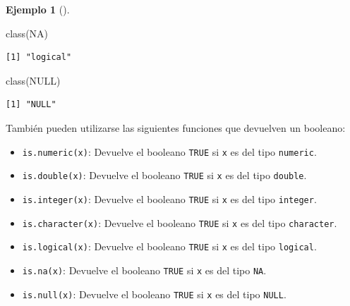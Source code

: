 \documentclass[
  spanish,
  a4paper,
]{scrreport}
\newenvironment{Shaded}{\begin{snugshade}}{\end{snugshade}}
\newcommand{\ConstantTok}[1]{\textcolor[rgb]{0.56,0.35,0.01}{#1}}
\newcommand{\FunctionTok}[1]{\textcolor[rgb]{0.28,0.35,0.67}{#1}}
\newcommand{\NormalTok}[1]{\textcolor[rgb]{0.00,0.23,0.31}{#1}}
\providecommand{\tightlist}{%
  \setlength{\itemsep}{0pt}\setlength{\parskip}{0pt}}
\theoremstyle{definition}
\theoremstyle{definition}
\newtheorem{example}{Ejemplo}[chapter]
\theoremstyle{remark}
\begin{document}
\begin{example}[]
\begin{Shaded}
\begin{Highlighting}[]
\FunctionTok{class}\NormalTok{(}\ConstantTok{NA}\NormalTok{)}
\end{Highlighting}
\end{Shaded}

\begin{verbatim}
[1] "logical"
\end{verbatim}

\begin{Shaded}
\begin{Highlighting}[]
\FunctionTok{class}\NormalTok{(}\ConstantTok{NULL}\NormalTok{)}
\end{Highlighting}
\end{Shaded}

\begin{verbatim}
[1] "NULL"
\end{verbatim}

\end{example}

También pueden utilizarse las siguientes funciones que devuelven un
booleano:

\begin{itemize}
\tightlist
\item
  \texttt{is.numeric(x)}: Devuelve el booleano \texttt{TRUE} si
  \texttt{x} es del tipo \texttt{numeric}.
\item
  \texttt{is.double(x)}: Devuelve el booleano \texttt{TRUE} si
  \texttt{x} es del tipo \texttt{double}.
\item
  \texttt{is.integer(x)}: Devuelve el booleano \texttt{TRUE} si
  \texttt{x} es del tipo \texttt{integer}.
\item
  \texttt{is.character(x)}: Devuelve el booleano \texttt{TRUE} si
  \texttt{x} es del tipo \texttt{character}.
\item
  \texttt{is.logical(x)}: Devuelve el booleano \texttt{TRUE} si
  \texttt{x} es del tipo \texttt{logical}.
\item
  \texttt{is.na(x)}: Devuelve el booleano \texttt{TRUE} si \texttt{x} es
  del tipo \texttt{NA}.
\item
  \texttt{is.null(x)}: Devuelve el booleano \texttt{TRUE} si \texttt{x}
  es del tipo \texttt{NULL}.
\end{itemize}
\end{document}
